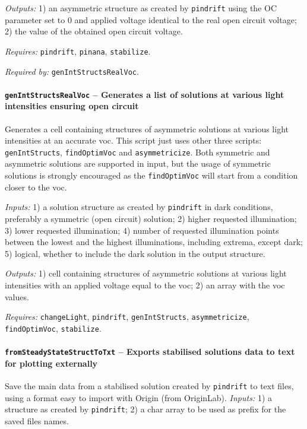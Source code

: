 		\textit{Outputs:} 1) an asymmetric structure as created by \texttt{pin\-drift} using the OC
		parameter set to 0 and applied voltage identical to the real open
		circuit voltage;
		2) the value of the obtained open circuit voltage.

		\textit{Requires:} \texttt{pin\-drift}, \texttt{pinana}, \texttt{stabilize}.

		\textit{Required by:} \texttt{gen\-Int\-Structs\-Real\-Voc}.

		\paragraph{\texttt{gen\-Int\-Structs\-Real\-Voc} -- Generates a list of solutions at various light intensities ensuring open circuit}
		Generates a cell containing structures of asymmetric solutions at various light intensities at an accurate \gls{voc}.
		This script just uses other three scripts: \texttt{gen\-Int\-Structs}, \texttt{find\-Optim\-Voc}
		and \texttt{asymmetricize}. Both symmetric and asymmetric solutions are supported in input, but the usage of symmetric solutions is strongly encouraged as the \texttt{find\-Optim\-Voc} will start from a condition closer to the \gls{voc}.

		\textit{Inputs:} 1) a solution structure as created by \texttt{pin\-drift} in dark
		conditions, preferably a symmetric (open circuit) solution;
		2) higher requested illumination;
		3) lower requested illumination;
		4) number of requested illumination points between the lowest and the highest illuminations, including extrema, except dark;
		5) logical, whether to include the dark solution in the output
		structure.

		\textit{Outputs:} 1) cell containing structures of asymmetric solutions at various light
		intensities with an applied voltage equal to the \gls{voc};
		2) an array with the \gls{voc} values.

		\textit{Requires:} \texttt{change\-Light}, \texttt{pin\-drift}, \texttt{gen\-Int\-Structs},
		\texttt{asymmetricize}, \texttt{find\-Optim\-Voc}, \texttt{stabilize}.

		\paragraph{\texttt{from\-Steady\-State\-Struct\-To\-Txt} -- Exports stabilised solutions data to text for plotting externally}
		Save the main data from a stabilised solution created by \texttt{pin\-drift} to text files, using a format easy to import with Origin (from OriginLab).
		\textit{Inputs:} 1) a structure as created by \texttt{pin\-drift};
		2) a char array to be used as prefix for the saved files names.

